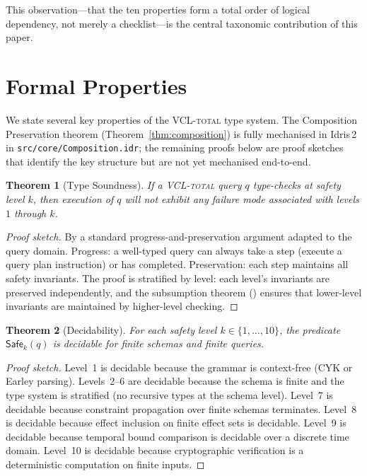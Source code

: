 \documentclass[11pt,a4paper]{article}
\newtheorem{theorem}{Theorem}[section]
\newcommand{\VCL}{\textsc{VCL-total}}
\newcommand{\Safe}[1]{\ensuremath{\mathsf{Safe}_{#1}}}
\begin{document}
This observation---that the ten properties form a total order of
logical dependency, not merely a checklist---is the central
taxonomic contribution of this paper.

\section{Formal Properties}\label{sec:formal}

We state several key properties of the \VCL{} type system.  The
Composition Preservation theorem (Theorem~\ref{thm:composition}) is
fully mechanised in Idris\,2 in \texttt{src/core/Composition.idr};
the remaining proofs below are proof sketches that identify the
key structure but are not yet mechanised end-to-end.

\begin{theorem}[Type Soundness]
If a \VCL{} query $q$ type-checks at safety level $k$, then
execution of $q$ will not exhibit any failure mode associated with
levels $1$ through $k$.
\end{theorem}

\begin{proof}[Proof sketch]
By a standard progress-and-preservation argument adapted to the query
domain.  Progress: a well-typed query can always take a step (execute
a query plan instruction) or has completed.  Preservation: each step
maintains all safety invariants.  The proof is stratified by level:
each level's invariants are preserved independently, and the
subsumption theorem () ensures that lower-level
invariants are maintained by higher-level checking.
\end{proof}

\begin{theorem}[Decidability]
For each safety level $k \in \{1, \ldots, 10\}$, the predicate
$\Safe{k}(q)$ is decidable for finite schemas and finite queries.
\end{theorem}

\begin{proof}[Proof sketch]
Level~1 is decidable because the grammar is context-free (CYK or
Earley parsing).  Levels~2--6 are decidable because the schema is
finite and the type system is stratified (no recursive types at the
schema level).  Level~7 is decidable because constraint propagation
over finite schemas terminates.  Level~8 is decidable because effect
inclusion on finite effect sets is decidable.  Level~9 is decidable
because temporal bound comparison is decidable over a discrete time
domain.  Level~10 is decidable because cryptographic verification
is a deterministic computation on finite inputs.
\end{proof}
\end{document}
